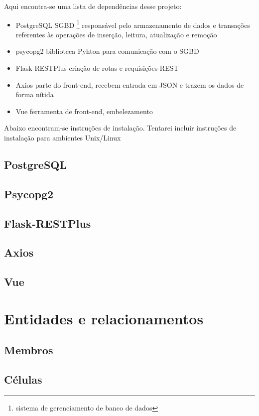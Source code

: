 \documentclass[11pt]{article}
\begin{document}
    Aqui encontra-se uma lista de dependências desse projeto:
    \begin{itemize}
        \item PostgreSQL \dir SGBD \footnote{sistema de gerenciamento de banco de dados}
        responsável pelo armazenamento de dados e transações referentes às operações de
        inserção, leitura, atualização e remoção
        \item psycopg2 \dir biblioteca Pyhton para comunicação com o SGBD
        \item Flask-RESTPlus \dir criação de rotas e requisições REST
        \item Axios \dir parte do front-end, recebem entrada em JSON e trazem os dados de
        forma nítida
        \item Vue \dir ferramenta de front-end, embelezamento
    \end{itemize}
    Abaixo encontram-se instruções de instalação. Tentarei incluir instruções de instalação
    para ambientes Unix/Linux

        \subsection{PostgreSQL}
        \subsection{Psycopg2}
        \subsection{Flask-RESTPlus}
        \subsection{Axios}
        \subsection{Vue}

    \section[Descrição]{Entidades e relacionamentos}

        \subsection{Membros}
        \subsection{Células}
\end{document}
